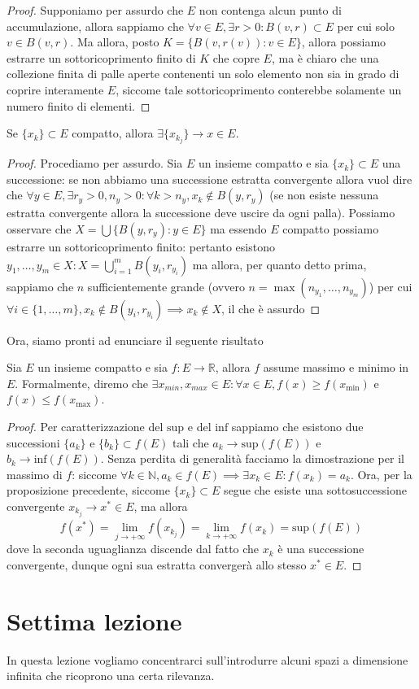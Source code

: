 \documentclass[12pt, twoside, italian, openany]{book}
\begin{document}
	\begin{proof}
		Supponiamo per assurdo che $E$ non contenga alcun punto di accumulazione, allora sappiamo che $\forall v \in E, \exists r > 0: B(v, r) \subset E$ per cui solo $v \in B(v, r)$. Ma allora, posto $K = \{ B(v, r(v)) : v \in E \}$, allora possiamo
		estrarre un sottoricoprimento finito di $K$ che copre $E$, ma è chiaro che una collezione finita di palle aperte contenenti un solo elemento non sia in grado di coprire interamente $E$, siccome tale sottoricoprimento conterebbe solamente un numero finito di elementi.
	\end{proof}
	\begin{cor}
		Se $\{ x_k \} \subset E$ compatto, allora $\exists \{ x_{k_j} \} \to x \in E$.
	\end{cor}
	\begin{proof}
		Procediamo per assurdo. Sia $E$ un insieme compatto e sia $\{ x_k \} \subset E$ una successione: se non abbiamo una successione estratta convergente allora vuol dire che $\forall y \in E, \exists r_y > 0, n_y > 0 : \forall k > n_y, x_k \not\in B(y, r_y)$ (se non esiste nessuna estratta convergente allora la successione deve uscire da ogni palla). 
		Possiamo osservare che $X = \bigcup \{ B(y, r_y) : y \in E\}$ ma essendo $E$ compatto possiamo estrarre un sottoricoprimento finito: pertanto esistono $y_1, \ldots, y_m \in X : X = \bigcup\limits_{i=1}^m B(y_i, r_{y_i})$ ma allora, per quanto detto prima, sappiamo che $n$ sufficientemente grande (ovvero $n = \max{(n_{y_1}, \ldots, n_{y_m})}$) per cui $\forall i \in \{ 1, \ldots, m \}, x_k \not\in B(y_i, r_{y_i}) \implies x_k \not\in X$, il che è assurdo 
	\end{proof}
	Ora, siamo pronti ad enunciare il seguente risultato
	\begin{theorem}
		Sia $E$ un insieme compatto e sia $f: E \to \mathbb{R}$, allora $f$ assume massimo e minimo in $E$. Formalmente, diremo che $\exists x_{min}, x_{max} \in E : \forall x \in E, f(x) \geq f(x_\text{min})$ e $f(x) \leq f(x_\text{max})$. 
	\end{theorem}
	\begin{proof}
		Per caratterizzazione del $\text{sup}$ e del $\text{inf}$ sappiamo che esistono due successioni $\{ a_k \}$ e $\{ b_k \} \subset f(E)$ tali che $a_k \to \text{sup}(f(E))$ e $b_k \to \text{inf}(f(E))$. Senza perdita di generalità facciamo la dimostrazione per il massimo di $f$: siccome $\forall k \in \mathbb{N}, a_k \in f(E) \implies \exists x_k \in E : f(x_k) = a_k$. Ora, per la proposizione precedente, siccome $\{ x_k \} \subset E$ segue che esiste una sottosuccessione convergente $x_{k_j} \to x^* \in E$, ma allora
		$$
			f(x^*) = \lim_{j \to +\infty} f(x_{k_j}) = \lim_{k \to +\infty} f(x_k) = \text{sup}(f(E))
		$$
		dove la seconda uguaglianza discende dal fatto che $x_k$ è una successione convergente, dunque ogni sua estratta convergerà allo stesso $x^* \in E$. 
	\end{proof}

	\chapter{Settima lezione}
	
	In questa lezione vogliamo concentrarci sull'introdurre alcuni spazi a dimensione infinita che ricoprono una certa rilevanza.
\end{document}
